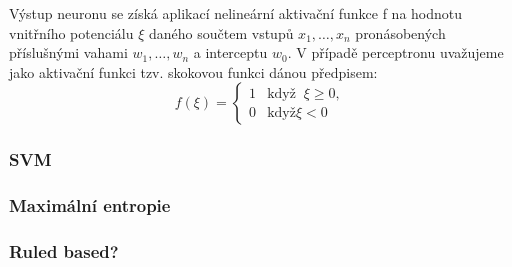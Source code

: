 Výstup neuronu se získá aplikací nelineární aktivační funkce f na hodnotu vnitřního potenciálu $\xi$ daného
součtem vstupů $x_1, \hdots , x_n$ pronásobených příslušnými vahami $w_1, \hdots , w_n$ a interceptu $w_0$. V případě perceptronu uvažujeme jako aktivační funkci tzv. skokovou funkci dánou předpisem:
$$f(\xi) = \begin{cases}1 & \text{když }\ \xi \geq 0,\\0 &\text{když} \xi < 0\end{cases} $$
\subsubsection{SVM}
\subsubsection{Maximální entropie}
\subsubsection{Ruled based?}